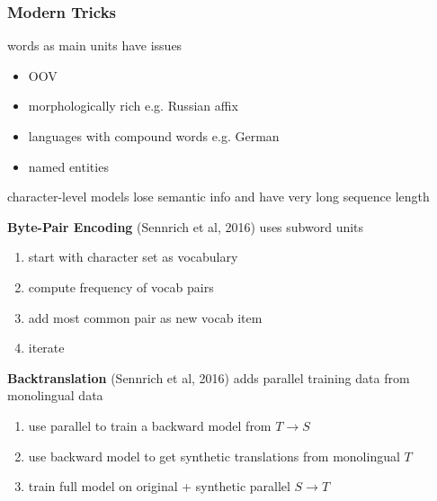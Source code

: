\documentclass[]{article}
\theoremstyle{definition}
\begin{document}
\subsubsection{Modern Tricks}%
\label{ssub:modern_tricks}

words as main units have issues
\begin{itemize}
    \item OOV
    \item morphologically rich e.g. Russian affix
    \item languages with compound words e.g. German
    \item named entities
\end{itemize}

character-level models lose semantic info and have very long sequence length

\textbf{Byte-Pair Encoding} (Sennrich et al, 2016) uses subword units
\begin{enumerate}
    \item start with character set as vocabulary
    \item compute frequency of vocab pairs
    \item add most common pair as new vocab item
    \item iterate
\end{enumerate}

\textbf{Backtranslation} (Sennrich et al, 2016) adds parallel training data from monolingual data
\begin{enumerate}
    \item use parallel to train a backward model from $T \to S$
    \item use backward model to get synthetic translations from monolingual $T$
    \item train full model on original + synthetic parallel $S \to T$
\end{enumerate}
\end{document}
